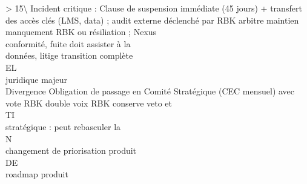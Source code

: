 \documentclass[12pt,landscape,a4paper]{article}
\begin{document}
\textgreater{} 15\textbackslash{}%
Incident critique :   Clause de suspension immédiate (45 jours) + transfert des accès clés (LMS, data) ; audit externe déclenché par RBK arbitre maintien\\
manquement            RBK                                                                                                            ou résiliation ; Nexus\\
conformité, fuite                                                                                                                    doit assister à la\\
données, litige                                                                                                                      transition complète\\
\vspace{0.5em}
\vspace{0.5em}
\vspace{0.5em}
\vspace{0.5em}
EL\\
juridique majeur\\
Divergence            Obligation de passage en Comité Stratégique (CEC mensuel) avec vote RBK double voix                            RBK conserve veto et\\
\vspace{0.5em}
\vspace{0.5em}
\vspace{0.5em}
\vspace{0.5em}
TI\\
stratégique :                                                                                                                        peut rebasculer la\\
\vspace{0.5em}
\vspace{0.5em}
\vspace{0.5em}
\vspace{0.5em}
N\\
changement de                                                                                                                        priorisation produit\\
\vspace{0.5em}
\vspace{0.5em}
\vspace{0.5em}
\vspace{0.5em}
DE\\
roadmap produit\\
\end{document}
